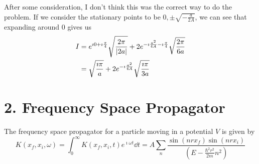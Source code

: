 \documentclass[a4paper,twoside]{article}
\begin{document}
\begin{itemize}
\begin{problem}
            
            After some consideration, I don't think this was the correct way to do the problem. If we consider the stationary points to be $ 0, \pm \sqrt{- \frac{a}{2A}} $, we can see that expanding around $ 0 $ gives us
            \begin{align}
                I &= e^{\imath 0 + \imath \frac{\pi}{4}} \sqrt{\frac{2 \pi}{\abs{2a}}} + 2 e^{- \imath \frac{a^2}{4A} - \imath \frac{\pi}{4}} \sqrt{\frac{2 \pi}{6a}} \\
                &= \sqrt{\frac{\imath \pi}{a}} + 2 e^{- \imath \frac{a^2}{4A}} \sqrt{\frac{\imath \pi}{3a}}
            \end{align}
        \end{problem}
\end{itemize}

\section*{2. Frequency Space Propagator}
The frequency space propagator for a particle moving in a potential $ V $ is given by
\begin{equation}
    K(x_f, x_i, \omega) = \int_{0}^{\infty} K(x_f, x_i, t) e^{\imath \omega t} \dd{t} = A \sum_n \frac{\sin(nrx_f) \sin(nrx_i)}{(E - \frac{\hbar^2 r^2}{2m} n^2)}
\end{equation}
\end{document}

